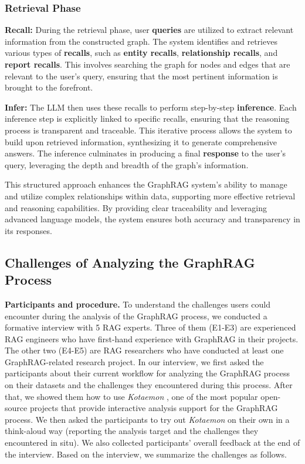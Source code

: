 \subsubsection{Retrieval Phase}

\textbf{Recall:} During the retrieval phase, user \textbf{queries} are utilized to extract relevant information from the constructed graph. The system identifies and retrieves various types of \textbf{recalls}, such as \textbf{entity recalls}, \textbf{relationship recalls}, and \textbf{report recalls}. This involves searching the graph for nodes and edges that are relevant to the user's query, ensuring that the most pertinent information is brought to the forefront.

\textbf{Infer:} The LLM then uses these recalls to perform step-by-step \textbf{inference}. Each inference step is explicitly linked to specific recalls, ensuring that the reasoning process is transparent and traceable. This iterative process allows the system to build upon retrieved information, synthesizing it to generate comprehensive answers. The inference culminates in producing a final \textbf{response} to the user's query, leveraging the depth and breadth of the graph's information.

This structured approach enhances the GraphRAG system's ability to manage and utilize complex relationships within data, supporting more effective retrieval and reasoning capabilities. By providing clear traceability and leveraging advanced language models, the system ensures both accuracy and transparency in its responses.

\subsection{Challenges of Analyzing the GraphRAG Process}
\textbf{Participants and procedure.} To understand the challenges users could encounter during the analysis of the GraphRAG process, we conducted a formative interview with 5 RAG experts. Three of them (E1-E3) are experienced RAG engineers who have first-hand experience with GraphRAG in their projects. The other two (E4-E5) are RAG researchers who have conducted at least one GraphRAG-related research project. In our interview, we first asked the participants about their current workflow for analyzing the GraphRAG process on their datasets and the challenges they encountered during this process. After that, we showed them how to use \textit{Kotaemon} \cite{kotaemon}, one of the most popular open-source projects that provide interactive analysis support for the GraphRAG process. We then asked the participants to try out \textit{Kotaemon} on their own in a think-aloud way (reporting the analysis target and the challenges they encountered in situ). We also collected participants' overall feedback at the end of the interview. Based on the interview, we summarize the challenges as follows.

